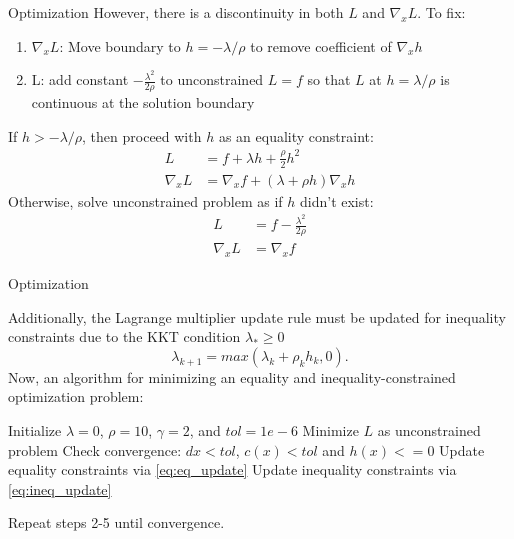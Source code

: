 \begin{frame}{Optimization}
    However, there is a discontinuity in both $L$ and $\nabla_x L$. To fix: 
    \begin{enumerate}
        \item $ \nabla_x L $: Move boundary to $ h = -\lambda / \rho $ to remove coefficient of $ \nabla_x h $
        \item L: add constant $ -\frac{\lambda^2}{2 \rho} $ to unconstrained $L = f$ so that $L$ at $ h = \lambda / \rho $ is continuous at the solution boundary 
    \end{enumerate}
% 
    If $h > -\lambda / \rho$, then proceed with $h$ as an equality constraint:  
% 
    \begin{align}
        L & = f + \lambda h + \frac{\rho}{2} h^2 \\ 
        \nabla_x L & = \nabla_x f + ( \lambda + \rho h ) \nabla_x h 
    \end{align}
% 
    Otherwise, solve unconstrained problem as if $h$ didn't exist: 
% 
    \begin{align}
        L & = f - \frac{\lambda^2}{2 \rho} \\ 
        \nabla_x L & = \nabla_x f 
    \end{align}
    
    
\end{frame}

\begin{frame}{Optimization} 

    Additionally, the Lagrange multiplier update rule must be updated for inequality constraints due to the KKT condition $ \lambda_* \geq 0 $
% 
    \begin{equation}
        \lambda_{k+1} = max( \lambda_k + \rho_k h_k, 0 ). 
        \label{eq:ineq_update}
    \end{equation} 
% 
% 
    Now, an algorithm for minimizing an equality and inequality-constrained optimization problem:  
    \begin{algorithm}[H]
    \begin{algorithmic}[1]
        \STATE Initialize $\lambda = 0$, $\rho = 10$, $ \gamma = 2 $, and $tol = 1e-6$
        \STATE Minimize $L$ as unconstrained problem 
        \STATE Check convergence: $dx < tol$, $c(x) < tol$ and $h(x) <= 0$
        \STATE Update equality constraints via \eqref{eq:eq_update}
        \STATE Update inequality constraints via \eqref{eq:ineq_update}
    \end{algorithmic}
    \caption{Equality and inequality-constrained optimization}
    \label{alg:seq}
    \end{algorithm}
    Repeat steps 2-5 until convergence. 
    
\end{frame} 


